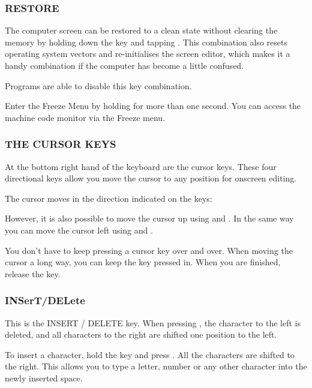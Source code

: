 \subsubsection{RESTORE}

The computer screen can be restored to a clean state without clearing the memory by holding down the  key and tapping . This combination also resets operating system vectors and re-initialises the screen editor, which makes it a handy combination if the computer has become a little confused.

Programs are able to disable this key combination.

Enter the Freeze Menu by holding  for more than one second. You can access the machine code monitor via the Freeze menu.

\newpage

\subsubsection{THE CURSOR KEYS}

At the bottom right hand of the keyboard are the cursor keys. These four directional keys allow you move the cursor to any position for onscreen editing.

The cursor moves in the direction indicated on the keys: \megakey{$\leftarrow$} \megakey{$\uparrow$} \megakey{$\rightarrow$} \megakey{$\downarrow$}

However, it is also possible to move the cursor up using  and \megakey{$\downarrow$}. In the same way you can move the cursor left using  and \megakey{$\rightarrow$}.

You don't have to keep pressing a cursor key over and over. When moving the cursor a long way, you can keep the key pressed in. When you are finished, release the key.

\subsubsection{INSerT/DELete}

This is the INSERT / DELETE key. When pressing , the character to the left is deleted, and all characters to the right are shifted one position to the left.

To insert a character, hold the  key and press . All the characters are shifted to the right. This allows you to type a letter, number or any other character into the newly inserted space.


